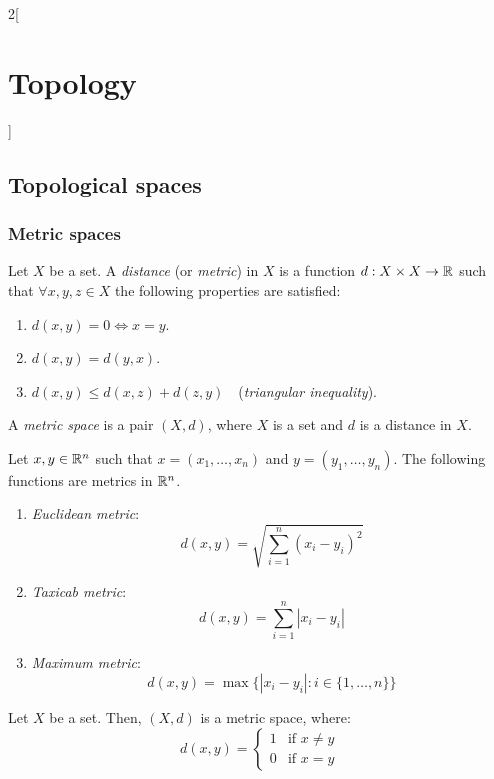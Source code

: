 \documentclass[../../../main_math.tex]{subfiles}
\begin{document}
\begin{multicols}{2}[\section{Topology}]
  \subsection{Topological spaces}
  \subsubsection{Metric spaces}
  \begin{definition}
    Let $X$ be a set. A \emph{distance} (or \emph{metric}) in $X$ is a function $d:X\times X\rightarrow\mathbb{R} $ such that $\forall x,y,z\in X$ the following properties are satisfied:
    \begin{enumerate}
      \item $d(x,y)=0\iff x=y$.
      \item $d(x,y)=d(y,x)$.
      \item $d(x,y)\leq d(x,z)+d(z,y)\quad$(\emph{triangular inequality}).
    \end{enumerate}
  \end{definition}
  \begin{definition}
    A \emph{metric space} is a pair $(X,d)$, where $X$ is a set and $d$ is a distance in $X$.
  \end{definition}
  \begin{proposition}
    Let $x,y\in\mathbb{R}^n$ such that $x=(x_1,\ldots,x_n)$ and $y=(y_1,\ldots,y_n)$. The following functions are metrics in $\mathbb{R}^n$.
    \begin{enumerate}
      \item \emph{Euclidean metric}: $$d(x,y)=\sqrt{\sum_{i=1}^n{(x_i-y_i)}^2}$$
      \item \emph{Taxicab metric}: $$d(x,y)=\sum_{i=1}^n|x_i-y_i|$$
      \item \emph{Maximum metric}: $$d(x,y)=\max\{|x_i-y_i|:i\in\{1,\ldots,n\}\}$$
    \end{enumerate}
  \end{proposition}
  \begin{proposition}
    Let $X$ be a set. Then, $(X,d)$ is a metric space, where: $$d(x,y)=
      \begin{cases}
        1 & \text{if }x\ne y \\
        0 & \text{if }x= y
      \end{cases}
$$
\end{proposition}
\end{multicols}
\end{document}
